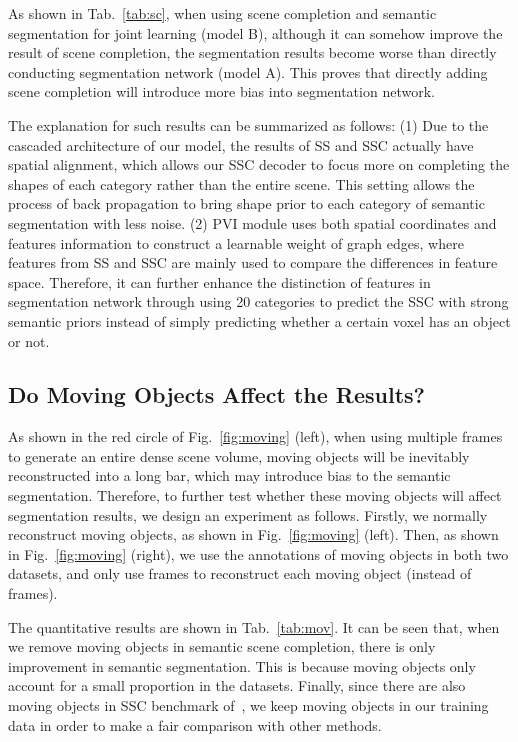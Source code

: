 \documentclass[letterpaper]{article} \usepackage{aaai21}  \usepackage{times}  \usepackage{helvet} \usepackage{courier}  \usepackage[hyphens]{url}  \usepackage{graphicx} \urlstyle{rm} \def\UrlFont{\rm}  \usepackage{natbib}  \usepackage{booktabs}
\begin{document}
	As shown in Tab.~\ref{tab:sc}, when using scene completion and semantic segmentation for joint learning (model B), although it can somehow improve the result of scene completion, the segmentation results become worse than directly conducting segmentation network (model A). This proves that directly adding scene completion will introduce more bias into segmentation network.
	
	The explanation for such results can be summarized as follows: (1) Due to the cascaded architecture of our model, the results of SS and SSC actually have spatial alignment, which allows our SSC decoder to focus more on completing the shapes of each category rather than the entire scene. This setting allows the process of back propagation to bring shape prior to each category of semantic segmentation with less noise. 
(2) PVI module uses both spatial coordinates and features information to construct a learnable weight of graph edges, where features from SS and SSC are mainly used to compare the differences in feature space.
Therefore, it can further enhance the distinction of features in segmentation network through using 20 categories to predict the SSC with strong semantic priors instead of simply predicting whether a certain voxel has an object or not.
		
	
	\subsection{Do Moving Objects Affect the Results?}
	
	As shown in the red circle of Fig.~\ref{fig:moving} (left), when using multiple frames to generate an entire dense scene volume, moving objects will be inevitably reconstructed into a long bar, which may introduce bias to the semantic segmentation. 
Therefore, to further test whether these moving objects will affect segmentation results, we design an experiment as follows. Firstly, we normally reconstruct moving objects, as shown in Fig.~\ref{fig:moving} (left). Then, as shown in Fig.~\ref{fig:moving} (right), we use the annotations of moving objects in both two datasets, and only use  frames to reconstruct each moving object (instead of  frames).
	
	The quantitative results are shown in Tab.~\ref{tab:mov}. It can be seen that, when we remove moving objects in semantic scene completion, there is only  improvement in semantic segmentation.  This is because moving objects only account for a small proportion in the datasets. 
Finally, since there are also moving objects in SSC benchmark of~\cite{behley2019semantickitti}, we keep moving objects in our training data in order to make a fair comparison with other methods.
	
\end{document}
